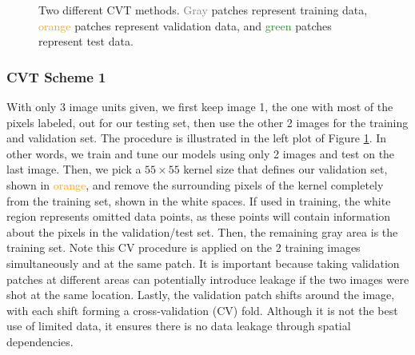 \documentclass[11pt, letterpaper, journal]{IEEEtran}
\begin{document}
\begin{figure}
    \centering
    \caption{Two different CVT methods. \textcolor{Gray}{Gray} patches represent training data, \textcolor{orange}{orange} patches represent validation data, and \textcolor{ForestGreen}{green} patches represent test data.}%
    \label{fig:test_schema}%
\end{figure}

\subsubsection{CVT Scheme 1}
With only 3 image units given, we first keep image 1, the one with most of the pixels labeled, out for our testing set, then use the other 2 images for the training and validation set. The procedure is illustrated in the left plot of Figure \ref{fig:test_schema}. In other words, we train and tune our models using only 2 images and test on the last image. Then, we pick a $55\times55$ kernel size that defines our validation set, shown in \textcolor{orange}{orange}, and remove the surrounding pixels of the kernel completely from the training set, shown in the white spaces. If used in training, the white region represents omitted data points, as these points will contain information about the pixels in the validation/test set. Then, the remaining gray area is the training set. Note this CV procedure is applied on the 2 training images simultaneously and at the same patch. It is important because taking validation patches at different areas can potentially introduce leakage if the two images were shot at the same location. Lastly, the validation patch shifts around the image, with each shift forming a cross-validation (CV) fold. Although it is not the best use of limited data, it ensures there is no data leakage through spatial dependencies. 
\end{document}

